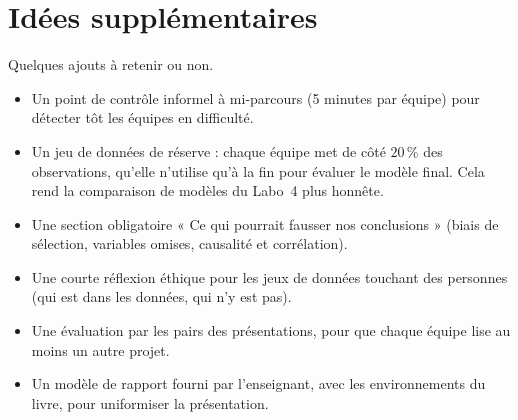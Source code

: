 \documentclass[11pt,letterpaper]{scrartcl}
\begin{document}
\section{Idées supplémentaires}

\begin{envremarque}
Quelques ajouts à retenir ou non.
\begin{itemize}
  \item Un point de contrôle informel à mi-parcours (5 minutes par équipe) pour détecter tôt les équipes en difficulté.
  \item Un jeu de données de réserve : chaque équipe met de côté $20\,\%$ des observations, qu'elle n'utilise qu'à la fin pour évaluer le modèle final. Cela rend la comparaison de modèles du Labo~4 plus honnête.
  \item Une section obligatoire « Ce qui pourrait fausser nos conclusions » (biais de sélection, variables omises, causalité et corrélation).
  \item Une courte réflexion éthique pour les jeux de données touchant des personnes (qui est dans les données, qui n'y est pas).
  \item Une évaluation par les pairs des présentations, pour que chaque équipe lise au moins un autre projet.
  \item Un modèle de rapport fourni par l'enseignant, avec les environnements du livre, pour uniformiser la présentation.
\end{itemize}
\end{envremarque}
\end{document}
